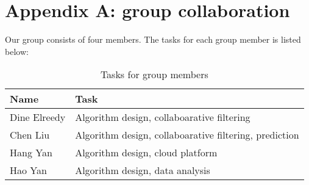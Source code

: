 \section*{Appendix A: group collaboration}
Our group consists of four members. The tasks for each group member is listed below:
\begin{table}[!ht]
  \centering
  \begin{tabular}{|p{5cm}|p{8cm}|}
    \hline
    Name  & Task\\
    \hline
    Dine Elreedy & Algorithm design, collaboarative filtering\\
    \hline
    Chen Liu & Algorithm design, collaboarative filtering, prediction\\
    \hline
    Hang Yan & Algorithm design, cloud platform\\
    \hline
    Hao Yan & Algorithm design, data analysis\\
    \hline
  \end{tabular}
  \caption{Tasks for group members}
  \label{tab:group}
\end{table}
